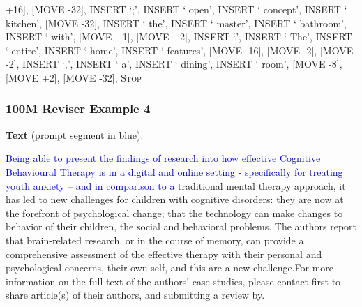 \documentclass[11pt]{article}
\DeclareRobustCommand{\Stop}{\ifmmode\text{\textsc{Stop}}\else\textsc{Stop}\fi}
\begin{document}
{+16], [MOVE -32], INSERT `;', INSERT ` open', INSERT ` concept', INSERT ` kitchen', [MOVE -32], INSERT ` the', INSERT ` master', INSERT ` bathroom', INSERT ` with', [MOVE +1], [MOVE +2], INSERT `.', INSERT ` The', INSERT ` entire', INSERT ` home', INSERT ` features', [MOVE -16], [MOVE -2], [MOVE -2], INSERT `,', INSERT ` a', INSERT ` dining', INSERT ` room', [MOVE -8], [MOVE +2], [MOVE -32], \Stop\par
}
\vspace{0.8em}
\subsubsection*{100M Reviser Example 4}
\textbf{Text} (prompt segment in blue).\par
\ttfamily\small \textcolor{blue}{Being able to present the findings of research into how effective Cognitive Behavioural Therapy is in a digital and online setting - specifically for treating youth anxiety – and in comparison to a} traditional mental therapy approach, it has led to new challenges for children with cognitive disorders: they are now at the forefront of psychological change; that the technology can make changes to behavior of their children, the social and behavioral problems. The authors report that brain-related research, or in the course of memory, can provide a comprehensive assessment of the effective therapy with their personal and psychological concerns, their own self, and this are a new challenge.\newline For more information on the full text of the authors’ case studies, please contact first to share article(s) of their authors, and submitting a review by.
\end{document}
